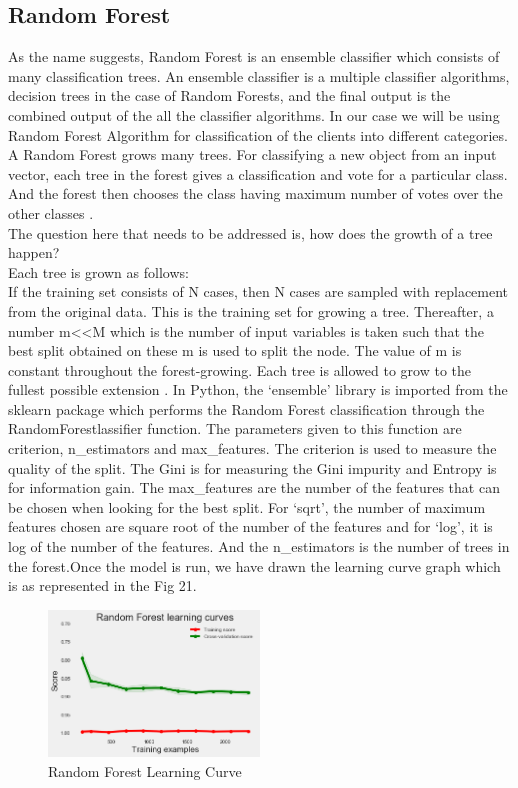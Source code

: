 \subsection{Random Forest} 
As the name suggests, Random Forest is an ensemble classifier which consists of many classification trees. An ensemble classifier is a multiple classifier algorithms, decision trees in the case of Random Forests, and the final output is the combined output of the all the classifier algorithms. In our case we will be using Random Forest Algorithm for classification of the clients into different categories. A Random Forest grows many trees. For classifying a new object from an input vector, each tree in the forest gives a classification and vote for a particular class. And the forest then chooses the class having maximum number of votes over the other classes \cite{link13}.\\
The question here that needs to be addressed is, how does the growth of a tree happen?\\
Each tree is grown as follows:\\
If the training set consists of N cases, then N cases are sampled with replacement from the original data. This is the training set for growing a tree. Thereafter, a number m<<M which is the number of input variables is taken such that the best split obtained on these m is used to split the node. The value of m is constant throughout the forest-growing. Each tree is allowed to grow to the fullest possible extension \cite{link13}.
In Python, the `ensemble' library is imported from the sklearn package which performs the Random Forest classification through the RandomForestlassifier function. The parameters given to this function are criterion, n\_estimators and max\_features. The criterion is used to measure the quality of the split. The Gini is for measuring the Gini impurity and Entropy is for information gain. The max\_features are the number of the features that can be chosen when looking for the best split. For `sqrt', the number of maximum features chosen are square root of the number of the features and for `log', it is log of the number of the features. And the n\_estimators is the number of trees in the forest.Once the model is run, we have drawn the learning curve graph which is as represented in the Fig 21.

\begin{figure}[H]
\caption{Random Forest Learning Curve}
\label{5.3}
\centering
\includegraphics[width=0.5\textwidth]{images/5_3.png}
\end{figure}

